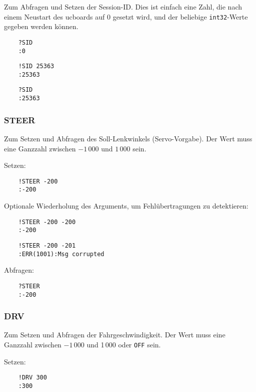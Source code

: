Zum Abfragen und Setzen der Session-ID. Dies ist einfach eine Zahl, die nach einem Neustart des ucboards auf 0 gesetzt wird, und der beliebige \verb|int32|-Werte gegeben werden können.


\begin{verbatim}
	?SID
	:0
\end{verbatim}

\begin{verbatim}
	!SID 25363
	:25363
\end{verbatim}

\begin{verbatim}
	?SID
	:25363
\end{verbatim}




\subsubsection{STEER}

Zum Setzen und Abfragen des Soll-Lenkwinkels (Servo-Vorgabe). Der Wert muss eine Ganzzahl zwischen $-1\,000$ und $1\,000$ sein.

Setzen:
\begin{verbatim}
	!STEER -200
	:-200
\end{verbatim}

\textcolor[rgb]{0.75,0.75,0.75}{Optionale Wiederholung des Arguments, um Fehlübertragungen zu detektieren:}
\begin{verbatim}
	!STEER -200 -200
	:-200
\end{verbatim}

\begin{verbatim}
	!STEER -200 -201
	:ERR(1001):Msg corrupted
\end{verbatim}

Abfragen:
\begin{verbatim}
	?STEER
	:-200
\end{verbatim}



\subsubsection{DRV}

Zum Setzen und Abfragen der Fahrgeschwindigkeit. Der Wert muss eine Ganzzahl zwischen $-1\,000$ und 1\,000 oder \verb|OFF| sein.

Setzen:
\begin{verbatim}
	!DRV 300
	:300
\end{verbatim}


